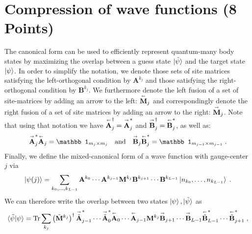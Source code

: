 \documentclass[a4paper, 12pt]{article}
\begin{document}
%
\section{Compression of wave functions \textbf{(8 Points)}}
%
The canonical form can be used to efficiently represent quantum-many body states by maximizing the overlap between a guess state $\ket{\tilde \psi}$ and the target state $\ket{\psi}$.
%
In order to simplify the notation, we denote those sets of site matrices satisfying the left-orthogonal condition by $\mathbf A^{k_j}$ and those satisfying the right-orthogonal condition by $\mathbf B^{k_{j}}$.
%
We furthermore denote the left fusion of a set of site-matrices by adding an arrow to the left: $\overset{\shortleftarrow}{\mathbf M}_j$ and correspondingly denote the right fusion of a set of site matrices by adding an arrow to the right: $\overset{\shortrightarrow}{\mathbf M}_j$.
%
Note that using that notation we have $\overset{\shortleftarrow}{\mathbf A}_j^\dagger = \overset{\shortrightarrow}{\mathbf A}^*_j$ and $\overset{\shortrightarrow}{\mathbf B}_j^\dagger = \overset{\shortleftarrow}{\mathbf B}^*_j$, as well as:
\begin{equation}
	\overset{\shortrightarrow}{\mathbf A}^*_j \overset{\shortleftarrow}{\mathbf A}_j = \mathbb 1_{m_j \times m_j} \quad \text{and} \quad
	\overset{\shortrightarrow}{\mathbf B}_j \overset{\shortleftarrow}{\mathbf B}^*_j = \mathbb 1_{m_{j-1} \times m_{j-1}} \; .
\end{equation}
%
Finally, we define the mixed-canonical form of a wave function with gauge-center $j$ via
\begin{equation}
	\ket{\psi(j)} = \sum_{k_0,\ldots,k_{L-1}} \mathbf A^{k_0} \cdots \mathbf A^{k_{j-1}} \mathbf M^{k_j} \mathbf B^{k_{j+1}} \cdots \mathbf B^{k_{L-1}} \ket{n_{k_0}, \ldots, n_{k_{L-1}}} \; .
\end{equation}
%
We can therefore write the overlap between two states $\ket{\psi}, \ket{\tilde \psi}$ as
\begin{equation}
	\braket{\tilde \psi | \psi}
	=
	\operatorname{Tr} \sum_{k_j}  \left(\tilde{\mathbf M}^{k_j}\right)^\dagger \overset{\shortrightarrow}{\tilde{\mathbf A}}^*_{j-1} \cdots \overset{\shortrightarrow}{\tilde{\mathbf A}}^*_{0} \overset{\shortleftarrow}{\mathbf A}_{0} \cdots \overset{\shortleftarrow}{\mathbf A}_{j-1} \mathbf M^{k_j} \overset{\shortrightarrow}{\mathbf{B}}_{j+1} \cdots \overset{\shortrightarrow}{\mathbf{B}}_{L-1}\overset{\shortleftarrow}{\tilde{\mathbf{B}}}^*_{L-1} \cdots \overset{\shortleftarrow}{\tilde{\mathbf{B}}}^*_{j+1}  \; ,
\end{equation}
\end{document}
